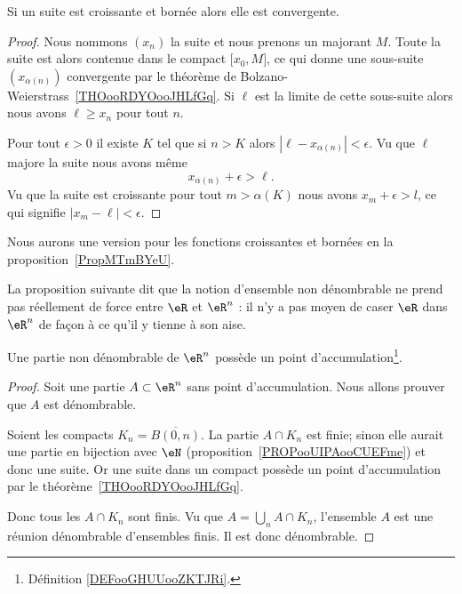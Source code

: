 \begin{corollary}   \label{CorFHbMqGGyi}
    Si un suite est croissante et bornée alors elle est convergente.
\end{corollary}

\begin{proof}
    Nous nommons \( (x_n)\) la suite et nous prenons un majorant \( M\). Toute la suite est alors contenue dans le compact \( \mathopen[ x_0 , M \mathclose]\), ce qui donne une sous-suite \( (x_{\alpha(n)})\) convergente par le théorème de Bolzano-Weierstrass~\ref{THOooRDYOooJHLfGq}. Si \( \ell\) est la limite de cette sous-suite alors nous avons \( \ell\geq x_n\) pour tout \( n\).

    Pour tout \( \epsilon>0\) il existe \( K\) tel que si \( n>K\) alors \( | \ell-x_{\alpha(n)} |<\epsilon\). Vu que \( \ell\) majore la suite nous avons même
    \begin{equation}
        x_{\alpha(n)}+\epsilon>\ell.
    \end{equation}
    Vu que la suite est croissante pour tout \( m>\alpha(K)\) nous avons \( x_m+\epsilon>l\), ce qui signifie \( | x_m-\ell |<\epsilon\).
\end{proof}
Nous aurons une version pour les fonctions croissantes et bornées en la proposition~\ref{PropMTmBYeU}.

La proposition suivante dit que la notion d'ensemble non dénombrable ne prend pas réellement de force entre \( \eR\) et \( \eR^n\) : il n'y a pas moyen de caser \( \eR\) dans \( \eR^n\) de façon à ce qu'il y tienne à son aise.

\begin{proposition}
    Une partie non dénombrable de \( \eR^n\) possède un point d'accumulation\footnote{Définition \ref{DEFooGHUUooZKTJRi}.}.
\end{proposition}

\begin{proof}
    Soit une partie \( A\subset \eR^n\) sans point d'accumulation. Nous allons prouver que \( A\) est dénombrable.

    Soient les compacts \( K_n=\overline{ B(0,n) }\). La partie \( A\cap K_n\) est finie; sinon elle aurait une partie en bijection avec \( \eN\) (proposition~\ref{PROPooUIPAooCUEFme}) et donc une suite. Or une suite dans un compact possède un point d'accumulation par le théorème~\ref{THOooRDYOooJHLfGq}.

    Donc tous les \( A\cap K_n\) sont finis. Vu que \( A=\bigcup_nA\cap K_n\), l'ensemble \( A\) est une réunion dénombrable d'ensembles finis. Il est donc dénombrable.
\end{proof}

